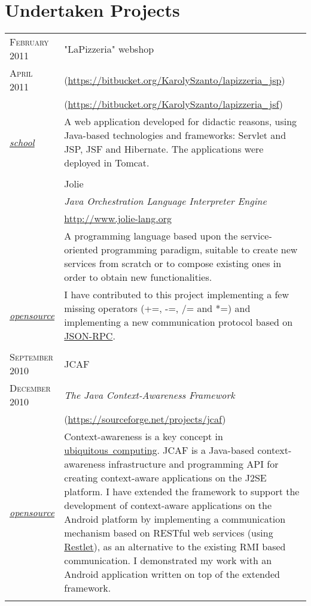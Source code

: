 \documentclass[a4paper,10pt]{article}
\newcommand{\projecttype}[1]{ \raggedleft  \footnotesize{\emph{\underline{#1}}}}
\newcommand{\pSchool}{\projecttype{school}}
\newcommand{\pOpensource}{\projecttype{opensource}}
\begin{document}
\section{Undertaken Projects}
\begin{longtable}{p{2.5cm}|p{11cm}}
 \raggedleft \textsc{February 2011} & "LaPizzeria" webshop\\
 \raggedleft \textsc{April 2011} & \footnotesize{(\url{https://bitbucket.org/KarolySzanto/lapizzeria_jsp})}\\
& \footnotesize{(\url{https://bitbucket.org/KarolySzanto/lapizzeria_jsf})}\\
\pSchool & \footnotesize{A web application developed for didactic reasons, using Java-based technologies and frameworks: Servlet and JSP, JSF and Hibernate. The applications were deployed in Tomcat.}\\
 \multicolumn{2}{c}{} \\

 & Jolie\\
 & \emph{Java Orchestration Language Interpreter Engine}\\
 & \footnotesize{\url{http://www.jolie-lang.org}}\\
 & \footnotesize{A programming language based upon the service-oriented programming paradigm, suitable to create new services from scratch or to compose existing ones in order to obtain new functionalities.}\\

 \pOpensource & \footnotesize{I have contributed to this project implementing a few missing operators (+=, -=, /= and *=) and implementing a new communication protocol based on \href{http://json-rpc.org/}{JSON-RPC}.}\\
 \multicolumn{2}{c}{} \\

 \raggedleft \textsc{September 2010} & JCAF\\
 \raggedleft \textsc{December 2010} & \emph{The Java Context-Awareness
 Framework} \\ 
 & \footnotesize{(\url{https://sourceforge.net/projects/jcaf})}\\
 \pOpensource & \footnotesize{Context-awareness is a key concept in
 \href{http://en.wikipedia.org/wiki/Ubiquitous_computing}{ubiquitous~computing}.
 JCAF is a Java-based context-awareness infrastructure and programming API for
 creating context-aware applications on the J2SE platform. I have extended the
 framework to support the development of context-aware applications on the
 Android platform by implementing a communication mechanism based on RESTful
 web services (using \href{http://www.restlet.org/}{Restlet}), as an alternative
 to the existing RMI based communication. I demonstrated my work with an
 Android application written on top of the extended framework.}\\
 \multicolumn{2}{c}{} \\
 

\end{longtable}
\end{document}
